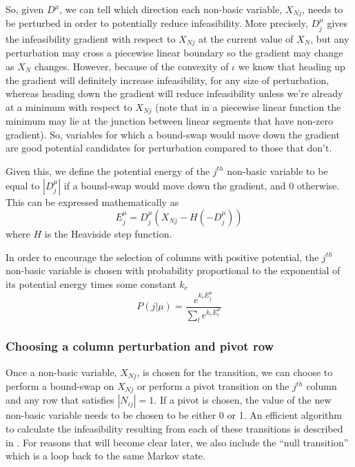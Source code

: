 \documentclass{article}
\begin{document}
So, given $D^\mu$, we can tell which direction each non-basic variable, $X_{Nj}$, needs to be perturbed in order to potentially reduce infeasibility. More precisely, $D^\mu_j$ gives the infeasibility gradient with respect to $X_{Nj}$ at the current value of $X_N$, but any perturbation may cross a piecewise linear boundary so the gradient may change as $X_N$ changes. However, because of the convexity of $\iota$ we know that heading up the gradient will definitely increase infeasibility, for any size of perturbation, whereas heading down the gradient will reduce infeasibility unless we're already at a minimum with respect to $X_{Nj}$ (note that in a piecewise linear function the minimum may lie at the junction between linear segments that have non-zero gradient). So, variables for which a bound-swap would move down the gradient are good potential candidates for perturbation compared to those that don't.

Given this, we define the potential energy of the $j^{th}$ non-basic variable to be equal to $|D^\mu_j|$ if a bound-swap would move down the gradient, and 0 otherwise. This can be expressed mathematically as
\[
E^\mu_j = D^\mu_j(X_{Nj} - H(-D^\mu_j))
\]
where $H$ is the Heaviside step function.

In order to encourage the selection of columns with positive potential, the $j^{th}$ non-basic variable is chosen with probability proportional to the exponential of its potential energy times some constant $k_c$
\begin{equation}
P(j|\mu) = \frac{e^{k_cE^\mu_j}}{\sum_l e^{k_cE^\mu_l}}
\label{columnChoice}
\end{equation}

\subsubsection{Choosing a column perturbation and pivot row}

Once a non-basic variable, $X_{Nj}$, is chosen for the transition, we can choose to perform a bound-swap on $X_{Nj}$ or perform a pivot transition on the $j^{th}$ column and any row that satisfies $|N_{ij}|=1$. If a pivot is chosen, the value of the new non-basic variable needs to be chosen to be either 0 or 1. An efficient algorithm to calculate the infeasibility resulting from each of these transitions is described in \cite[Chapter~9]{maros2002computational}. For reasons that will become clear later, we also include the ``null transition'' which is a loop back to the same Markov state.
\end{document}
